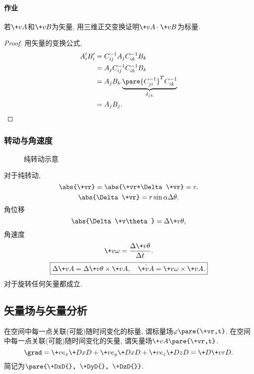 \documentclass[../LectureNotes.tex]{subfiles}
\begin{document}

\paragraph{作业} %
\label{par:作业}

若$\+vA$和$\+vB$为矢量, 用三维正交变换证明$\+vA\cdot\+vB$为标量.


\begin{proof}
    用矢量的变换公式,
    \begin{align*}
        A'_i B'_i &= C_{ij}^{-1} A_j C_{ik}^{-1} B_k \\
        &= A_j C_{ij}^{-1} C_{ik}^{-1} B_k \\
        &= A_jB_k \underbrace{\pare{C^{-1}_{ji}}^T C^{-1}_{ik}}_{\delta_{jk}} \\
        &= A_jB_j.
    \end{align*}
\end{proof}


\subsubsection{转动与角速度} %
\label{ssub:转动与角速度}

\begin{figure}[ht]
    \centering
    \caption{纯转动示意}
\end{figure}
对于纯转动,
\[ \abs{\+vr} = \abs{\+vr+\Delta\+vr} = r. \]
\[ \abs{\Delta \+vr} = r\sin\alpha\Delta\theta. \]
角位移
\[ \abs{\Delta\+v\theta} = \Delta\+v\theta, \]
角速度
\[ \+v\omega = \frac{\Delta\+v\theta}{\Delta t}. \]
\[ \boxed{\Delta\+vA = \Delta\+v\theta\times\+vA,\quad \dot{\+vA} = \+v\omega\times\+vA.} \]
对于旋转任何矢量都成立.



\subsection{矢量场与矢量分析} %
\label{sub:矢量场与矢量分析}

在空间中每一点关联(可能)随时间变化的标量, 谓标量场$\varphi\pare{\+vr,t}$. 在空间中每一点关联(可能)随时间变化的矢量, 谓矢量场$\+vA\pare{\+vr,t}$.
\[ \grad = \+ve_x \+DxD{} + \+ve_y\+DxD{} + \+ve_z\+DzD{} = \+D{\+vr}D{}. \]
简记为$\displaystyle \pare{\+DxD{}, \+DyD{}, \+DzD{}}$.
\end{document}
